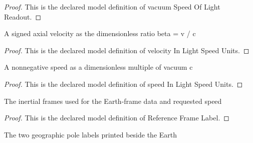 \begin{proof}
  This is the declared model definition of vacuum Speed Of Light Readout.
\end{proof}
\begin{definition}
  \label{def:physics:phyx-mini-0591:phyxminiproblems-problemphyxmini0591-velocityinlightspeedunits}
  A signed axial velocity as the dimensionless ratio beta = v / c
\end{definition}
\begin{proof}
  This is the declared model definition of velocity In Light Speed Units.
\end{proof}
\begin{definition}
  \label{def:physics:phyx-mini-0591:phyxminiproblems-problemphyxmini0591-speedinlightspeedunits}
  A nonnegative speed as a dimensionless multiple of vacuum c
\end{definition}
\begin{proof}
  This is the declared model definition of speed In Light Speed Units.
\end{proof}
\begin{definition}
  \label{def:physics:phyx-mini-0591:phyxminiproblems-problemphyxmini0591-referenceframelabel}
  The inertial frames used for the Earth-frame data and requested speed
\end{definition}
\begin{proof}
  This is the declared model definition of Reference Frame Label.
\end{proof}
\begin{definition}
  \label{def:physics:phyx-mini-0591:phyxminiproblems-problemphyxmini0591-geographicpole}
  The two geographic pole labels printed beside the Earth
\end{definition}
